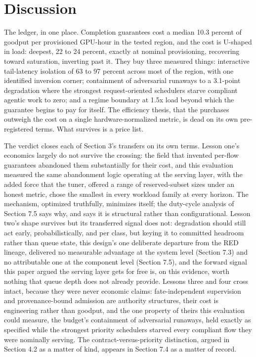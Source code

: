 \section{Discussion}

The ledger, in one place. Completion guarantees cost a median 10.3
percent of goodput per provisioned GPU-hour in the tested region, and
the cost is U-shaped in load: deepest, 22 to 24 percent, exactly at
nominal provisioning, recovering toward saturation, inverting past it.
They buy three measured things: interactive tail-latency isolation of 63 to 97 percent across most of the region, with one identified inversion
corner; containment of adversarial runaways to a 3.1-point degradation
where the strongest request-oriented schedulers starve compliant agentic
work to zero; and a regime boundary at 1.5x load beyond which the
guarantee begins to pay for itself. The efficiency thesis, that the
purchases outweigh the cost on a single hardware-normalized metric, is
dead on its own pre-registered terms. What survives is a price list.

The verdict closes each of Section 3's transfers on its own terms.
Lesson one's economics largely do not survive the crossing: the field
that invented per-flow guarantees abandoned them substantially for their
cost, and this evaluation measured the same abandonment logic operating
at the serving layer, with the added force that the tuner, offered a
range of reserved-subset sizes under an honest metric, chose the
smallest in every workload family at every horizon. The mechanism,
optimized truthfully, minimizes itself; the duty-cycle analysis of
Section 7.5 says why, and says it is structural rather than
configurational. Lesson two's shape survives but its transferred signal
does not: degradation should still act early, probabilistically, and per
class, but keying it to committed headroom rather than queue state,
this design's one deliberate departure from the RED lineage, delivered
no measurable advantage at the system level (Section 7.3) and no
attributable one at the component level (Section 7.5), and the forward
signal this paper argued the serving layer gets for free is, on this
evidence, worth nothing that queue depth does not already provide.
Lessons three and four cross intact, because they were never economic
claims: fate-independent supervision and provenance-bound admission are
authority structures, their cost is engineering rather than goodput, and
the one property of theirs this evaluation could measure, the budget's
containment of adversarial runaways, held exactly as specified while
the strongest priority schedulers starved every compliant flow they
were nominally serving. The contract-versus-priority distinction,
argued in Section 4.2 as a matter of kind, appears in Section 7.4 as a
matter of record.


